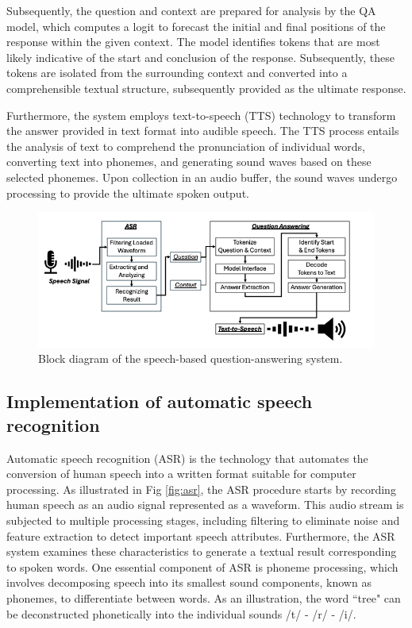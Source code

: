 \documentclass{../styles/svproc}
\begin{document}
Subsequently, the question and context are prepared for analysis by the QA model, which computes a logit to forecast the initial and final positions of the response within the given context. The model identifies tokens that are most likely indicative of the start and conclusion of the response. Subsequently, these tokens are isolated from the surrounding context and converted into a comprehensible textual structure, subsequently provided as the ultimate response.

Furthermore, the system employs text-to-speech (TTS) technology to transform the answer provided in text format into audible speech. The TTS process entails the analysis of text to comprehend the pronunciation of individual words, converting text into phonemes, and generating sound waves based on these selected phonemes. Upon collection in an audio buffer, the sound waves undergo processing to provide the ultimate spoken output.

\begin{figure}[t]
	\centering
	\includegraphics[width=1\textwidth]{./images/qa-new.png}
	\caption{Block diagram of the speech-based question-answering system.}
	\label{fig:qa}
\end{figure}

\subsection{Implementation of automatic speech recognition}
Automatic speech recognition (ASR) is the technology that automates the conversion of human speech into a written format suitable for computer processing. As illustrated in Fig \ref{fig:asr}, the ASR procedure starts by recording human speech as an audio signal represented as a waveform. This audio stream is subjected to multiple processing stages, including filtering to eliminate noise and feature extraction to detect important speech attributes. Furthermore, the ASR system examines these characteristics to generate a textual result corresponding to spoken words. One essential component of ASR is phoneme processing, which involves decomposing speech into its smallest sound components, known as phonemes, to differentiate between words. As an illustration, the word ``tree" can be deconstructed phonetically into the individual sounds /t/ - /r/ - /i/.
\end{document}
